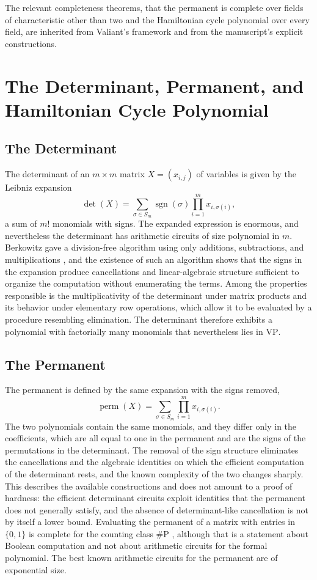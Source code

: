 \documentclass[11pt,letterpaper]{report}
\theoremstyle{plain}
\theoremstyle{definition}
\theoremstyle{remark}
\DeclareMathOperator{\sgn}{sgn}
\DeclareMathOperator{\perm}{perm}
\newcommand{\VP}{\mathrm{VP}}
\begin{document}
The relevant completeness theorems, that the permanent is complete over fields of characteristic other than two and the Hamiltonian cycle polynomial over every field, are inherited from Valiant's framework \cite{Valiant1979} and from the manuscript's explicit constructions.

\chapter{The Determinant, Permanent, and Hamiltonian Cycle Polynomial}

\section{The Determinant}

The determinant of an $m\times m$ matrix $X=(x_{i,j})$ of variables is given by the Leibniz expansion
\[
\det(X)=
\sum_{\sigma\in S_m}
\sgn(\sigma)
\prod_{i=1}^{m}x_{i,\sigma(i)},
\]
a sum of $m!$ monomials with signs. The expanded expression is enormous, and nevertheless the determinant has arithmetic circuits of size polynomial in $m$. Berkowitz gave a division-free algorithm using only additions, subtractions, and multiplications \cite{Berkowitz1984}, and the existence of such an algorithm shows that the signs in the expansion produce cancellations and linear-algebraic structure sufficient to organize the computation without enumerating the terms. Among the properties responsible is the multiplicativity of the determinant under matrix products and its behavior under elementary row operations, which allow it to be evaluated by a procedure resembling elimination. The determinant therefore exhibits a polynomial with factorially many monomials that nevertheless lies in $\VP$.

\section{The Permanent}

The permanent is defined by the same expansion with the signs removed,
\[
\perm(X)=
\sum_{\sigma\in S_m}
\prod_{i=1}^{m}x_{i,\sigma(i)}.
\]
The two polynomials contain the same monomials, and they differ only in the coefficients, which are all equal to one in the permanent and are the signs of the permutations in the determinant. The removal of the sign structure eliminates the cancellations and the algebraic identities on which the efficient computation of the determinant rests, and the known complexity of the two changes sharply. This describes the available constructions and does not amount to a proof of hardness: the efficient determinant circuits exploit identities that the permanent does not generally satisfy, and the absence of determinant-like cancellation is not by itself a lower bound. Evaluating the permanent of a matrix with entries in $\{0,1\}$ is complete for the counting class $\#\mathrm{P}$ \cite{Valiant1979b}, although that is a statement about Boolean computation and not about arithmetic circuits for the formal polynomial. The best known arithmetic circuits for the permanent are of exponential size.
\end{document}
